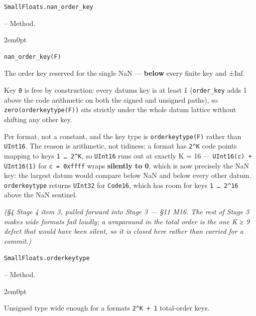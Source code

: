 \par\medskip\noindent\begin{minipage}{\linewidth}
\hypertarget{9794079948674987482}{\texttt{SmallFloats.nan\_\allowbreak{}order\_\allowbreak{}key}}  -- {Method.}
\nopagebreak
\begin{adjustwidth}{2em}{0pt}


\begin{verbatim}
nan_order_key(F)
\end{verbatim}

The order key reserved for the single NaN — \textbf{below} every finite key and ±Inf.

Key \texttt{0} is free by construction: every datum{\textquotesingle}s key is at least 1 (\texttt{order\_\allowbreak{}key} adds 1 above the code arithmetic on both the signed and unsigned paths), so \texttt{zero(orderkeytype(F))} sits strictly under the whole datum lattice without shifting any other key.

Per format, not a constant, and the key type is \texttt{orderkeytype(F)} rather than \texttt{UInt16}. The reason is arithmetic, not tidiness: a format has \texttt{2{\textasciicircum}K} code points mapping to keys \texttt{1 … 2{\textasciicircum}K}, so \texttt{UInt16} runs out at exactly K = 16 — \texttt{UInt16(c) + UInt16(1)} for \texttt{c = 0xffff} wraps \textbf{silently to 0}, which is now precisely the NaN key: the largest datum would compare below NaN and below every other datum. \texttt{orderkeytype} returns \texttt{UInt32} for \texttt{Code16}, which has room for keys \texttt{1 … 2{\textasciicircum}16} above the NaN sentinel.

\emph{(§4 Stage 4 item 3, pulled forward into Stage 3 — §11 M16. The rest of Stage 3 makes wide formats fail loudly; a wraparound in the total order is the one K ≥ 9 defect that would have been silent, so it is closed here rather than carried for a commit.)}



\end{adjustwidth}
\end{minipage}
\par\medskip

\par\medskip\noindent\begin{minipage}{\linewidth}
\hypertarget{3009066085088880286}{\texttt{SmallFloats.orderkeytype}}  -- {Method.}
\nopagebreak
\begin{adjustwidth}{2em}{0pt}

Unsigned type wide enough for a format{\textquotesingle}s \texttt{2{\textasciicircum}K + 1} total-order keys.



\end{adjustwidth}
\end{minipage}
\par\medskip

